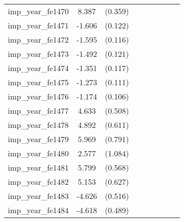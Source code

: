 {\begin{tabular}{l*{4}{cc}}
imp\_year\_fe1470&    8.387\sym{***}&  (0.359)&                  &         &                  &         &                  &         \\
imp\_year\_fe1471&   -1.606\sym{***}&  (0.122)&                  &         &                  &         &                  &         \\
imp\_year\_fe1472&   -1.595\sym{***}&  (0.116)&                  &         &                  &         &                  &         \\
imp\_year\_fe1473&   -1.492\sym{***}&  (0.121)&                  &         &                  &         &                  &         \\
imp\_year\_fe1474&   -1.351\sym{***}&  (0.117)&                  &         &                  &         &                  &         \\
imp\_year\_fe1475&   -1.273\sym{***}&  (0.111)&                  &         &                  &         &                  &         \\
imp\_year\_fe1476&   -1.174\sym{***}&  (0.106)&                  &         &                  &         &                  &         \\
imp\_year\_fe1477&    4.633\sym{***}&  (0.508)&                  &         &                  &         &                  &         \\
imp\_year\_fe1478&    4.892\sym{***}&  (0.611)&                  &         &                  &         &                  &         \\
imp\_year\_fe1479&    5.969\sym{***}&  (0.791)&                  &         &                  &         &                  &         \\
imp\_year\_fe1480&    2.577\sym{*}  &  (1.084)&                  &         &                  &         &                  &         \\
imp\_year\_fe1481&    5.799\sym{***}&  (0.568)&                  &         &                  &         &                  &         \\
imp\_year\_fe1482&    5.153\sym{***}&  (0.627)&                  &         &                  &         &                  &         \\
imp\_year\_fe1483&   -4.626\sym{***}&  (0.516)&                  &         &                  &         &                  &         \\
imp\_year\_fe1484&   -4.618\sym{***}&  (0.489)&                  &         &                  &         &                  &         \\

\end{tabular}}
